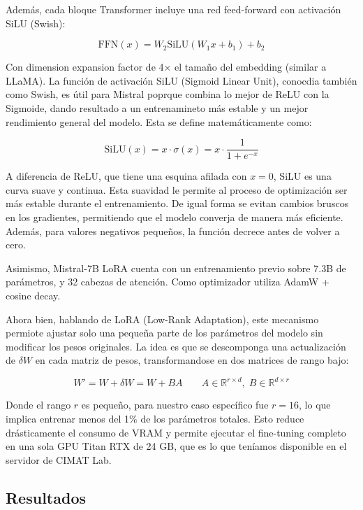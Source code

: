Además, cada bloque Transformer incluye una red feed-forward con activación SiLU (Swish):

\[
    \text{FFN}(x) = W_2 \text{SiLU}(W_1x + b_1) + b_2
\]

Con dimension expansion factor de 4× el tamaño del embedding (similar a LLaMA). La función 
de activación SiLU (Sigmoid Linear Unit), conocdia también como Swish, es útil para Mistral poprque
combina lo mejor de ReLU con la Sigmoide, dando resultado a un entrenamineto más estable y un mejor 
rendimiento general del modelo. Esta se define matemáticamente como:

\[
    \text{SiLU}(x) = x \cdot \sigma(x) = x \cdot \frac{1}{1 + e^{-x}}
\]

A diferencia de ReLU, que tiene una esquina afilada con $x=0$, SiLU es una curva suave y continua. 
Esta suavidad le permite al proceso de optimización ser más estable durante el entrenamiento. De igual
forma se evitan cambios bruscos en los gradientes, permitiendo que el modelo converja de manera
más eficiente. Además, para valores negativos pequeños, la función decrece antes de volver a cero.

Asimismo, Mistral-7B LoRA cuenta con un entrenamiento previo sobre 7.3B de parámetros, y 32 
cabezas de atención. Como optimizador utiliza AdamW + cosine decay.  

Ahora bien, hablando de LoRA (Low-Rank Adaptation), este mecanismo permiote ajustar solo una 
pequeña parte de los parámetros del modelo sin modificar los pesos originales. La idea es que
se descomponga una actualización de $\delta W$ en cada matriz de pesos, transformandose en 
dos matrices de rango bajo:

\[
    W' = W + \delta W = W + BA \;\;\;\;\;\;\; A \in \mathbb{R}^{r \times d}, \; B \in \mathbb{R}^{d \times r}
\]

Donde el rango $r$ es pequeño, para nuestro caso específico fue $r = 16$, lo que implica entrenar
menos del 1\% de los parámetros totales. Esto reduce drásticamente el consumo de VRAM y permite ejecutar 
el fine-tuning completo en una sola GPU Titan RTX de 24 GB, que es lo que teníamos disponible
en el servidor de CIMAT Lab.

\clearpage

\subsection{Resultados}

